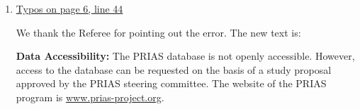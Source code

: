 \begin{enumerate}

			\item \underline {Typos on page 6, line 44}
			
			We thank the Referee for pointing out the error. The new text is:
			
			\begin{shadequote}
				\textbf{Data Accessibility:} The PRIAS database is not openly accessible. However, access to the database can be requested on the basis of a study proposal approved by the PRIAS steering committee. The website of the PRIAS program is \url{www.prias-project.org}.
			\end{shadequote}
			
		\end{enumerate}


